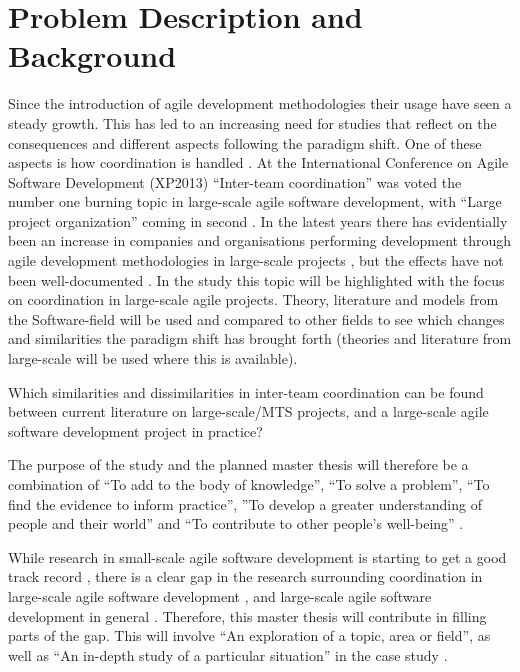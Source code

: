 \section{Problem Description and Background}
\label{pdab}

Since the introduction of agile development methodologies their usage have seen a steady growth. This has led to an increasing need for studies that reflect on the consequences and different aspects following the paradigm shift. One of these aspects is how coordination is handled \cite{Agerfalk2006, Leffingwell2007, Cockburn2002, Batra2010}. At the International Conference on Agile Software Development (XP2013) ``Inter-team coordination'' was voted the number one burning topic in large-scale agile software development, with ``Large project organization'' coming in second \cite{Dingsoyr2013b}.  In the latest years there has evidentially been an increase in companies and organisations performing development through agile development methodologies in large-scale projects \cite{Paasivaara2012, Com2013, Vlietland2015, Lindvall2004, Dingsoyr2013b, Lee2008, Paasivaara2009}, but the effects have not been well-documented \cite{Pikkarainen2008, Paasivaara2012, Freudenberg2010, Haaster2014, Dingsoyr2013a, Reifer2003}. In the study this topic will be highlighted with the focus on coordination in large-scale agile projects. Theory, literature and models from the Software-field will be used and compared to other fields to see which changes and similarities the paradigm shift has brought forth (theories and literature from large-scale will be used where this is available).

\begin{fancyquotes}
Which similarities and dissimilarities in inter-team coordination can be found between current literature on large-scale/MTS projects, and a large-scale agile software development project in practice?
\end{fancyquotes}

The purpose of the study and the planned master thesis will therefore be a combination of ``To add to the body of knowledge'', ``To solve a problem'', ``To find the evidence to inform practice'', ''To develop a greater understanding of people and their world'' and ``To contribute to other people's well-being'' \cite{Oates2006}.

While research in small-scale agile software development is starting to get a good track record \cite{Paasivaara2012, Haaster2014}, there is a clear gap in the research surrounding coordination in large-scale agile software development \cite{Pikkarainen2008, Paasivaara2012, Dingsoyr2013b}, and large-scale agile software development in general \cite{Freudenberg2010, Haaster2014}. Therefore, this master thesis will contribute in filling parts of the gap. This will involve ``An exploration of a topic, area or field'', as well as ``An in-depth study of a particular situation'' in the case study \cite{Oates2006}.

